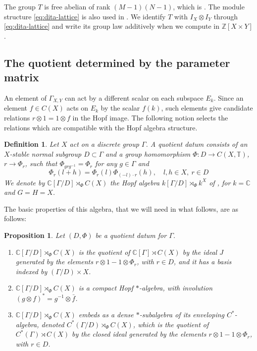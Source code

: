 \documentclass[11pt,reqno]{amsart}
\newtheorem{prop}[thm]{Proposition}
\newtheorem{defi}[thm]{Definition}
\theoremstyle{definition}
\numberwithin{equation}{section}
\begin{document}
The group $T$ is free abelian of rank $(M-1)(N-1)$, which is \cite[Proposition 4.2]{BBi15}. The module structure \eqref{eq:dita-lattice} is also used in \cite[Section 4.2]{BO26}. We identify $T$ with $I_X\otimes I_Y$ through \eqref{eq:dita-lattice} and write its group law additively when we compute in $\mathbb Z[X\times Y]$.

\subsection{The quotient determined by the parameter matrix}

An element of $\Gamma_{X,Y}$ can act by a different scalar on each subspace $E_k$. Since an element $f\in C(X)$ acts on $E_k$ by the scalar $f(k)$, such elements give candidate relations $r\otimes1=1\otimes f$ in the Hopf image. The following notion \cite[Definition 2.1]{Bic15} selects the relations which are compatible with the Hopf algebra structure.

\begin{defi}
Let $X$ act on a discrete group $\Gamma$. A quotient datum consists of an $X$-stable normal subgroup $D\subset\Gamma$ and a group homomorphism $\Phi:D\to C(X,\mathbb T)$, $r\to\Phi_r$, such that $\Phi_{grg^{-1}}=\Phi_r$ for any $g\in\Gamma$ and
$$\Phi_r(l+h)=\Phi_r(l)\Phi_{(-l)\cdot r}(h),
\quad l,h\in X,\ r\in D$$
We denote by $\mathbb C[\Gamma/D]\rtimes_\Phi C(X)$ the Hopf algebra $k[\Gamma/D]\rtimes_\Phi k^X$ of \cite[Proposition 2.4]{Bic15}, for $k=\mathbb C$ and $G=H=X$.
\end{defi}

The basic properties of this algebra, that we will need in what follows, are as follows:

\begin{prop}\label{prop:dita-quotient}
Let $(D,\Phi)$ be a quotient datum for $\Gamma$.
\begin{enumerate}
\item $\mathbb C[\Gamma/D]\rtimes_\Phi C(X)$ is the quotient of $\mathbb C[\Gamma]\rtimes C(X)$ by the ideal $J$ generated by the elements $r\otimes1-1\otimes\Phi_r$, with $r\in D$, and it has a basis indexed by $(\Gamma/D)\times X$.

\item $\mathbb C[\Gamma/D]\rtimes_\Phi C(X)$ is a compact Hopf $*$-algebra, with involution $(g\otimes f)^*=g^{-1}\otimes\bar f$.

\item $\mathbb C[\Gamma/D]\rtimes_\Phi C(X)$ embeds as a dense $*$-subalgebra of its enveloping $C^*$-algebra, denoted $C^*(\Gamma/D)\rtimes_\Phi C(X)$, which is the quotient of $C^*(\Gamma)\rtimes C(X)$ by the closed ideal generated by the elements $r\otimes1-1\otimes\Phi_r$, with $r\in D$.
\end{enumerate}
\end{prop}
\end{document}
